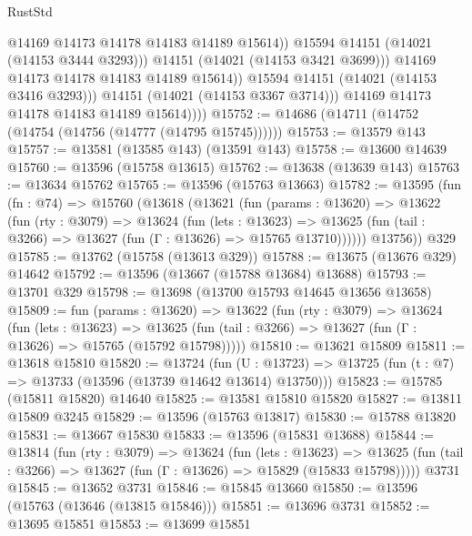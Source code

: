\begin{lexlean}{RustStd}
\begin{coremodule}
                            @14169
                            @14173
                            @14178
                            @14183
                            @14189
                            @15614))
                        @15594
                        @14151
                        (@14021 (@14153 @3444 @3293)))
                      @14151
                      (@14021 (@14153 @3421 @3699)))
                    @14169
                    @14173
                    @14178
                    @14183
                    @14189
                    @15614))
                @15594
                @14151
                (@14021 (@14153 @3416 @3293)))
              @14151
              (@14021 (@14153 @3367 @3714)))
            @14169
            @14173
            @14178
            @14183
            @14189
            @15614))))
@15752 := @14686 (@14711 (@14752 (@14754 (@14756 (@14777 (@14795 @15745))))))
@15753 := @13579 @143
@15757 := @13581 (@13585 @143) (@13591 @143)
@15758 := @13600 @14639
@15760 := @13596 (@15758 @13615)
@15762 := @13638 (@13639 @143)
@15763 := @13634 @15762
@15765 := @13596 (@15763 @13663)
@15782 := @13595
    (fun (fn : @74) =>
    @15760
      (@13618
        (@13621
          (fun (params : @13620) =>
          @13622
            (fun (rty : @3079) =>
            @13624
              (fun (lets : @13623) =>
              @13625 (fun (tail : @3266) => @13627 (fun (Γ : @13626) => @15765 @13710))))))
        @13756))
    @329
@15785 := @13762 (@15758 (@13613 @329))
@15788 := @13675 (@13676 @329) @14642
@15792 := @13596 (@13667 (@15788 @13684) @13688)
@15793 := @13701 @329
@15798 := @13698 (@13700 @15793 @14645 @13656 @13658)
@15809 := fun (params : @13620) =>
  @13622
    (fun (rty : @3079) =>
    @13624
      (fun (lets : @13623) =>
      @13625 (fun (tail : @3266) => @13627 (fun (Γ : @13626) => @15765 (@15792 @15798)))))
@15810 := @13621 @15809
@15811 := @13618 @15810
@15820 := @13724
    (fun (U : @13723) => @13725 (fun (t : @7) => @13733 (@13596 (@13739 @14642 @13614) @13750)))
@15823 := @15785 (@15811 @15820) @14640
@15825 := @13581 @15810 @15820
@15827 := @13811 @15809 @3245
@15829 := @13596 (@15763 @13817)
@15830 := @15788 @13820
@15831 := @13667 @15830
@15833 := @13596 (@15831 @13688)
@15844 := @13814
    (fun (rty : @3079) =>
    @13624
      (fun (lets : @13623) =>
      @13625 (fun (tail : @3266) => @13627 (fun (Γ : @13626) => @15829 (@15833 @15798)))))
    @3731
@15845 := @13652 @3731
@15846 := @15845 @13660
@15850 := @13596 (@15763 (@13646 (@13815 @15846)))
@15851 := @13696 @3731
@15852 := @13695 @15851
@15853 := @13699 @15851

\end{coremodule}
\end{lexlean}
